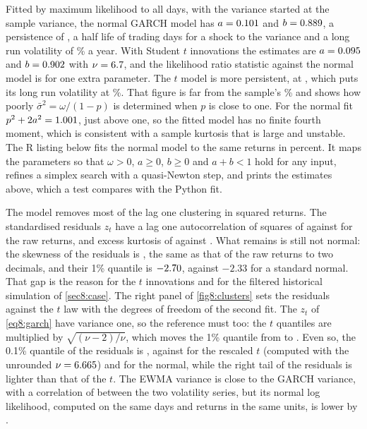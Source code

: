 \begin{chapterrefs}
Fitted by maximum likelihood to all \tdN{} days, with the variance started at the sample variance,
the normal GARCH model has $a=0.101$ and $b=0.889$, a persistence of \gaPersN, a half life of
\gaHalfN{} trading days for a shock to the variance and a long run volatility of \gaLrVolN\% a year.
With Student $t$ innovations the estimates are $a=0.095$ and $b=0.902$ with $\nu=6.7$, and
the likelihood ratio statistic against the normal model is \gaLR{} for one extra parameter. The $t$
model is more persistent, at \gaPersT, which puts its long run volatility at \gaLrVolT\%. That figure
is far from the sample's \tdVolAnn\% and shows how poorly $\bar\sigma^2=\omega/(1-p)$ is determined when
$p$ is close to one. For the normal fit $p^2+2a^2=1.001$, just above one, so the fitted model has
no finite fourth moment, which is consistent with a sample kurtosis that is large and unstable.
The R listing below fits the normal model to the same returns in percent. It maps the parameters so
that $\omega>0$, $a\ge0$, $b\ge0$ and $a+b<1$ hold for any input, refines a simplex search with a
quasi-Newton step, and prints the estimates above, which a test compares with the Python fit.


The model removes most of the lag one clustering in squared returns. The standardised residuals $z_t$
have a lag one autocorrelation of squares of \gaResAcSq{} against \acSq{} for the raw returns, and excess
kurtosis of \gaResKurt{} against \tdKurt. What remains is still not normal: the skewness of the residuals
is \gaResSkew, the same as that of the raw returns to two decimals, and their 1\% quantile is $-2.70$, against $-2.33$ for a standard normal. That gap is
the reason for the $t$ innovations and for the filtered historical simulation of
\cref{sec8:case}. The right panel of \cref{fig8:clusters} sets the residuals against the $t$ law with the
\gaNu{} degrees of freedom of the second fit. The $z_t$ of \cref{eq8:garch} have variance one, so the
reference must too: the $t$ quantiles are multiplied by $\sqrt{(\nu-2)/\nu}$, which moves the 1\%
quantile from \gaTQRaw{} to \gaTQ. Even so, the 0.1\% quantile of the residuals is \gaResQThou,
against \gaTQThou{} for the rescaled $t$ (computed with the unrounded $\nu=6.665$) and \gaNQThou{} for the normal, while the right tail of the
residuals is lighter than that of the $t$. The EWMA variance is close to the GARCH variance, with a correlation of \ewCorr{}
between the two volatility series, but its normal log likelihood, computed on the same days and returns
in the same units, is lower by \ewLLdiff.


\end{chapterrefs}
